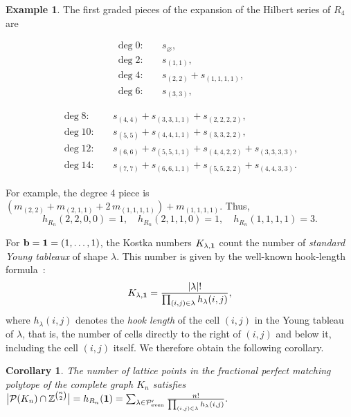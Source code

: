 \documentclass[12pt,a4paper]{extarticle}
\newtheorem{corollary}[theorem]{Corollary}
\theoremstyle{definition}
\newtheorem{example}[theorem]{Example}
\begin{document}
\begin{example}
The first graded pieces of the expansion of the Hilbert series of
$
R_4
$ are
\begin{center}
\vspace{-0.5cm}
\begin{minipage}[]{0.35\textwidth}
\begin{align*}
\deg 0:\quad & s_{\varnothing},\\[2pt]
\deg 2:\quad & s_{(1,1)},\\[2pt]
\deg 4:\quad & s_{(2,2)} + s_{(1,1,1,1)},\\[2pt]
\deg 6:\quad & s_{(3,3)},
\end{align*}      
\end{minipage} 
\begin{minipage}[]{0.5\textwidth}
\begin{align*}
\deg 8:\quad &
s_{(4,4)} + s_{(3,3,1,1)} + s_{(2,2,2,2)},\\[2pt]
\deg 10:\quad &
s_{(5,5)} + s_{(4,4,1,1)} + s_{(3,3,2,2)},\\[2pt]
\deg 12:\quad &
s_{(6,6)} + s_{(5,5,1,1)} + s_{(4,4,2,2)} + s_{(3,3,3,3)},\\[2pt]
\deg 14:\quad &
s_{(7,7)} + s_{(6,6,1,1)} + s_{(5,5,2,2)} + s_{(4,4,3,3)}.
\end{align*}    
\end{minipage}
\end{center}
For example, the degree 4 piece is $(m_{(2,2)} + m_{(2,1,1)} + 2\,m_{(1,1,1,1)}) + m_{(1,1,1,1)}$. Thus,
\[
    h_{R_n}(2,2,0,0) = 1, \quad h_{R_n}(2,1,1,0) = 1, \quad h_{R_n}(1,1,1,1) = 3.
\]
\end{example}
For ${\bf b}={\bf 1}=(1,\ldots,1)$, the Kostka numbers $K_{\lambda,{\bf 1}}$ count the number of
\emph{standard Young tableaux} of shape $\lambda$.
This number is given by the well-known hook‑length formula~\cite{FrameRobinsonThrall1954}:
$$
K_{\lambda,{\bf 1}}
=
\frac{|\lambda|!}{\prod_{(i,j)\in\lambda} h_\lambda(i,j)},
$$
where $h_\lambda(i,j)$ denotes the \emph{hook length} of the cell $(i,j)$ in the Young tableau of
$\lambda$, that is, the number of cells directly to the right of $(i,j)$ and  below it,
including the cell $(i,j)$ itself.
We therefore obtain the following corollary.
\begin{corollary}
The number of lattice points in the fractional perfect matching polytope of the complete graph
$K_n$ satisfies
$
\bigl|\mathcal{P}(K_n)\cap\mathbb{Z}^{\binom{n}{2}}\bigr|
=
h_{R_n}({\bf 1})
=
\sum_{\lambda\in\mathcal{P}'_{\mathrm{even}}}
\frac{n!}{\prod_{(i,j)\in\lambda} h_\lambda(i,j)}.
$
\end{corollary}
\end{document}
